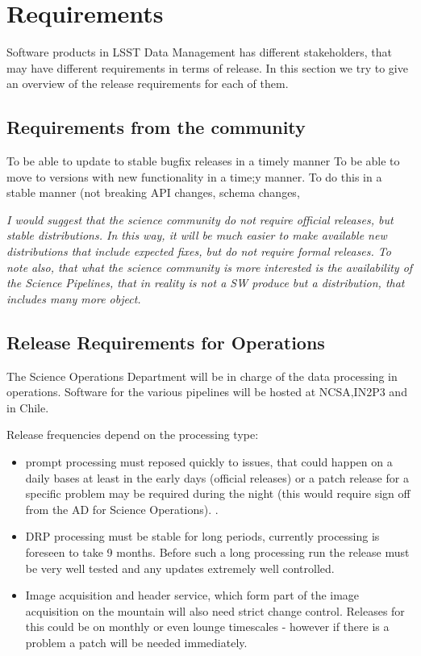 \section{Requirements} \label{sec:reqs}

Software products in LSST Data Management has different stakeholders, that may have different requirements in terms of release.
In this section we try to give an overview of the release requirements for each of them.


\subsection{Requirements from the community } \label{sec:comreqs}

To be able to update to stable bugfix releases in a timely manner
To be able to move to versions with new functionality in a time;y manner.
To do this in a stable manner (not breaking API changes, schema changes,

\textit{ I would suggest that the science community do not require official releases, but stable distributions.
In this way, it will be much easier to make available new distributions that include expected fixes,
but do not require formal releases.
To note also, that what the science community is more interested is the availability of the Science Pipelines,
that in reality is not a SW produce but a distribution, that includes many more object.  }

\subsection{Release Requirements for Operations} \label{sec:procreqs}

The Science Operations Department will be  in charge  of the data processing in operations. Software for the various pipelines
will be hosted at NCSA,IN2P3 and in Chile.

Release frequencies depend on the processing type:

\begin{itemize}
\item prompt processing must reposed quickly to issues, that could happen on a daily bases at least in the early days (official releases)
 or a  patch release  for a specific problem may be required during the night (this would require sign off from the AD for Science Operations).  .
\item DRP processing  must be stable for long periods, currently processing is foreseen to take 9 months.  Before such a long processing run the release must be very well tested and any updates extremely well controlled.
\item Image acquisition and header service, which form part of the image acquisition on the mountain will also need strict change control. Releases for this could be on monthly or even lounge timescales - however if there is a problem a patch will be needed immediately.
\end{itemize}

